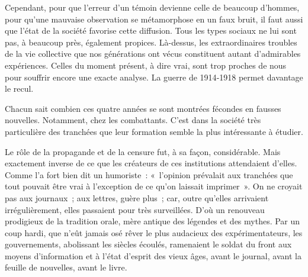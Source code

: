 \documentclass[french,twoside]{book} %
\begin{document}
\noindent Cependant, pour que l’erreur d’un témoin devienne celle de beaucoup d’hommes, pour qu’une mauvaise observation se métamorphose en un faux bruit, il faut aussi que l’état de la société favorise cette diffusion. Tous les types sociaux ne lui sont pas, à beaucoup près, également pro­pices. Là-dessus, les extraordinaires troubles de la vie collective que nos générations ont vécus constituent autant d’admirables expériences. Celles du moment présent, à dire vrai, sont trop proches de nous pour souffrir encore une exacte analyse. La guerre de 1914‑1918 permet davantage le recul.\par
Chacun sait combien ces quatre années se sont montrées fécondes en fausses nouvelles. Notamment, chez les combattants. C’est dans la société très particulière des tranchées que leur formation semble la plus intéres­sante à étudier.\par
Le rôle de la propagande et de la censure fut, à sa façon, considérable. Mais exactement inverse de ce que les créateurs de ces institutions atten­daient d’elles. Comme l’a fort bien dit un humoriste : « l’opinion prévalait aux tranchées que tout pouvait être vrai à l’exception de ce qu’on laissait imprimer ». On ne croyait pas aux journaux ; aux lettres, guère plus ; car, outre qu’elles arrivaient irrégulièrement, elles passaient pour très  
\label{p51} surveillées. D’où un renouveau prodigieux de la tradition orale, mère antique des légendes et des mythes. Par un coup hardi, que n’eût jamais osé rêver le plus audacieux des expérimentateurs, les gouvernements, abolissant les siècles écoulés, ramenaient le soldat du front aux moyens d’information et à l’état d’esprit des vieux âges, avant le journal, avant la feuille de nouvelles, avant le livre.\par
\end{document}

